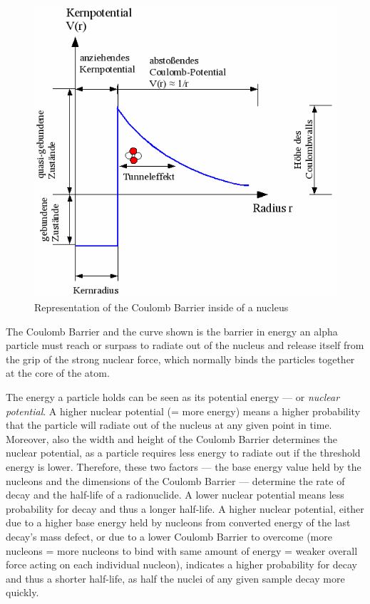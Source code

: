 \begin{figure}[h!]
  \centering
  \includegraphics[scale=0.7]{img/coulomb}
  \caption{Representation of the Coulomb Barrier inside of a nucleus}
  \label{fig:coulomb}
\end{figure}

The Coulomb Barrier and the curve shown is the barrier in energy an alpha particle must reach or surpass to radiate out of the nucleus and release itself from the grip of the strong nuclear force, which normally binds the particles together at the core of the atom. 

The energy a particle holds can be seen as its potential energy --- or \emph{nuclear potential}. A higher nuclear potential (= more energy) means a higher probability that the particle will radiate out of the nucleus at any given point in time. Moreover, also the width and height of the Coulomb Barrier determines the nuclear potential, as a particle requires less energy to radiate out if the threshold energy is lower. Therefore, these two factors --- the base energy value held by the nucleons and the dimensions of the Coulomb Barrier --- determine the rate of decay and the half-life of a radionuclide. A lower nuclear potential means less probability for decay and thus a longer half-life. A higher nuclear potential, either due to a higher base energy held by nucleons from converted energy of the last decay's mass defect, or due to a lower Coulomb Barrier to overcome (more nucleons = more nucleons to bind with same amount of energy = weaker overall force acting on each individual nucleon), indicates a higher probability for decay and thus a shorter half-life, as half the nuclei of any given sample decay more quickly. 

